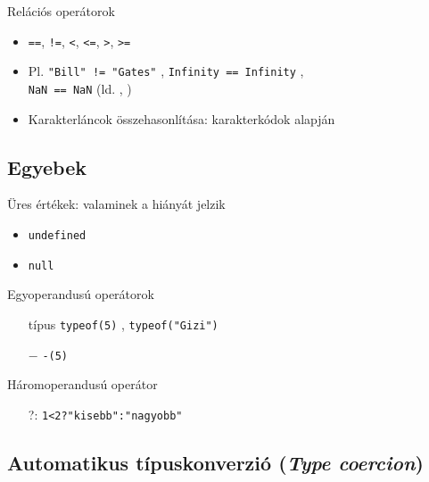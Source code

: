 \begin{frame}
    Relációs operátorok
    \begin{itemize}
        \item \texttt{==}, \texttt{!=}, \texttt{<}, \texttt{<=}, \texttt{>}, \texttt{>=} 
        \item Pl. \texttt{"Bill" != "Gates"} , \texttt{Infinity == Infinity} , \\  \texttt{NaN == NaN}  (ld. , )
        \item Karakterláncok összehasonlítása: karakterkódok alapján
    \end{itemize}
\end{frame}

\subsection{Egyebek}

\begin{frame}
    Üres értékek: valaminek a hiányát jelzik
    \begin{itemize}
        \item \texttt{undefined}
        \item \texttt{null}
    \end{itemize}
    \vfill
    Egyoperandusú operátorok
    \begin{itemize}
        \item[típus] \texttt{typeof(5)} , \texttt{typeof("Gizi")} 
        \item[$-$] \texttt{-(5)} 
    \end{itemize}
    \vfill
    Háromoperandusú operátor
    \begin{itemize}
        \item[?:] \texttt{1<2?"kisebb":"nagyobb"} 
    \end{itemize}
\end{frame}

\subsection{Automatikus típuskonverzió (\emph{Type coercion})}

